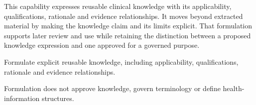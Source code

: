 This capability expresses reusable clinical knowledge with its applicability, qualifications, rationale and evidence relationships. It moves beyond extracted material by making the knowledge claim and its limits explicit. That formulation supports later review and use while retaining the distinction between a proposed knowledge expression and one approved for a governed purpose.



Formulate explicit reusable knowledge, including applicability, qualifications, rationale and evidence relationships.



Formulation does not approve knowledge, govern terminology or define health-information structures.


